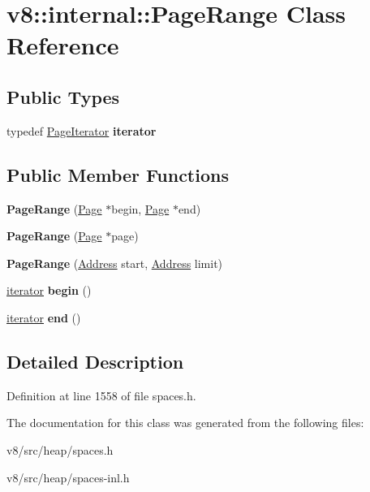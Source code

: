 \hypertarget{classv8_1_1internal_1_1PageRange}{}\section{v8\+:\+:internal\+:\+:Page\+Range Class Reference}
\label{classv8_1_1internal_1_1PageRange}
\subsection*{Public Types}
\begin{DoxyCompactItemize}
\item 
\mbox{\label{classv8_1_1internal_1_1PageRange_ad6ec5b5488c14a1d5ece6e8decc71ff4}} 
typedef \mbox{\hyperlink{classv8_1_1internal_1_1PageIteratorImpl}{Page\+Iterator}} {\bfseries iterator}
\end{DoxyCompactItemize}
\subsection*{Public Member Functions}
\begin{DoxyCompactItemize}
\item 
\mbox{\label{classv8_1_1internal_1_1PageRange_a0186c6c3214c2cc7e2b9514c2d6e541f}} 
{\bfseries Page\+Range} (\mbox{\hyperlink{classv8_1_1internal_1_1Page}{Page}} $\ast$begin, \mbox{\hyperlink{classv8_1_1internal_1_1Page}{Page}} $\ast$end)
\item 
\mbox{\label{classv8_1_1internal_1_1PageRange_a44e9423fc642336995aae2cfe0e6ca20}} 
{\bfseries Page\+Range} (\mbox{\hyperlink{classv8_1_1internal_1_1Page}{Page}} $\ast$page)
\item 
\mbox{\label{classv8_1_1internal_1_1PageRange_a5a5afe06b5d3927205118f616f8f1e08}} 
{\bfseries Page\+Range} (\mbox{\hyperlink{classuintptr__t}{Address}} start, \mbox{\hyperlink{classuintptr__t}{Address}} limit)
\item 
\mbox{\label{classv8_1_1internal_1_1PageRange_a2f8e28a3411934eec7db280b2e8de6d1}} 
\mbox{\hyperlink{classv8_1_1internal_1_1PageIteratorImpl}{iterator}} {\bfseries begin} ()
\item 
\mbox{\label{classv8_1_1internal_1_1PageRange_ace3aebb81e22c381f4b5c79d0aa2040e}} 
\mbox{\hyperlink{classv8_1_1internal_1_1PageIteratorImpl}{iterator}} {\bfseries end} ()
\end{DoxyCompactItemize}


\subsection{Detailed Description}


Definition at line 1558 of file spaces.\+h.



The documentation for this class was generated from the following files\+:\begin{DoxyCompactItemize}
\item 
v8/src/heap/spaces.\+h\item 
v8/src/heap/spaces-\/inl.\+h\end{DoxyCompactItemize}
